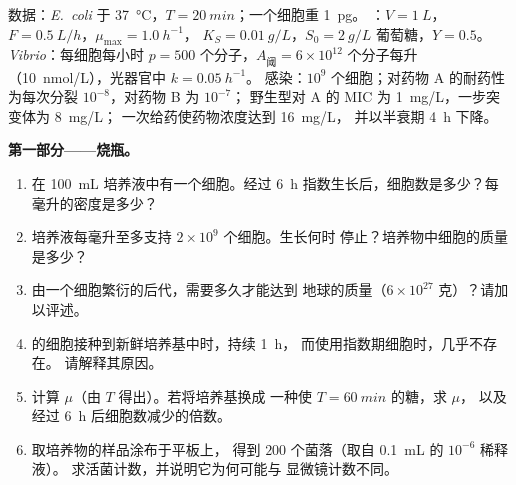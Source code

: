\begin{problem}
\label{pb:b3:bacteriology:1}
数据：\emph{E.~coli} 于 \qty{37}{\celsius}，$T = \qty{20}{min}$；一个细胞重 \qty{1}{pg}。
：$V = \qty{1}{L}$，$F = \qty{0.5}{L/h}$，$\mu_{\max} = \qty{1.0}{h^{-1}}$，
$K_{S} = \qty{0.01}{g/L}$，$S_{0} =
\qty{2}{g/L}$ 葡萄糖，$Y = 0.5$。\emph{Vibrio}：每细胞每小时
$p = 500$ 个分子，$A_{\text{阈}} = 6\times 10^{12}$
个分子每升（\qty{10}{nmol/L}），光器官中 $k = \qty{0.05}{h^{-1}}$。
感染：$10^{9}$ 个细胞；对药物 A 的耐药性为每次分裂 $10^{-8}$，对药物 B 为 $10^{-7}$；
野生型对 A 的 MIC 为 \qty{1}{mg/L}，一步突变体为 \qty{8}{mg/L}；
一次给药使药物浓度达到 \qty{16}{mg/L}，
并以半衰期 \qty{4}{h} 下降。

\medskip
\noindent\textbf{第一部分——烧瓶。}
\begin{enumerate}
  \item 在 \qty{100}{mL} 培养液中有一个细胞。经过
        \qty{6}{h} 指数生长后，细胞数是多少？每毫升的密度是多少？
  \item 培养液每毫升至多支持 $2\times 10^{9}$ 个细胞。生长何时
        停止？培养物中细胞的质量是多少？
  \item 由一个细胞繁衍的后代，需要多久才能达到
        地球的质量（$6\times 10^{27}$ 克）？请加以评述。
  \item {}的细胞接种到新鲜培养基中时，持续 \qty{1}{h}，
        而使用指数期细胞时，几乎不存在。
        请解释其原因。
  \item 计算 $\mu$（由 $T$ 得出）。若将培养基换成
        一种使 $T = \qty{60}{min}$ 的糖，求 $\mu$，
        以及经过 \qty{6}{h} 后细胞数减少的倍数。
  \item 取培养物的样品涂布于平板上，
        得到 $200$ 个菌落（取自 \qty{0.1}{mL} 的 $10^{-6}$ 稀释液）。
        求活菌计数，并说明它为何可能与
        显微镜计数不同。
\end{enumerate}


\end{problem}
